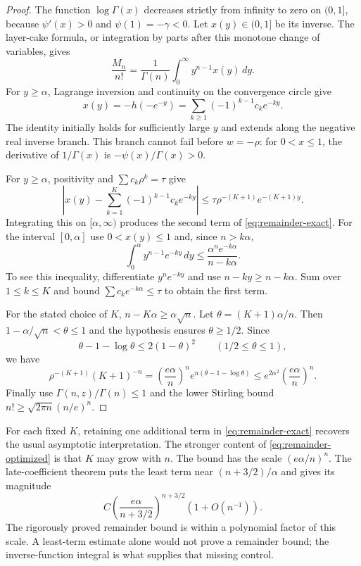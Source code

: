\begin{proof}
The function $\log\Gamma(x)$ decreases strictly from infinity to zero on
$(0,1]$, because $\psi'(x)>0$ and $\psi(1)=-\gamma<0$.
Let $x(y)\in(0,1]$ be its inverse.  The layer-cake formula, or integration
by parts after this monotone change of variables, gives
\begin{equation}
 \frac{M_n}{n!}=\frac1{\Gamma(n)}\int_0^\infty y^{n-1}x(y)\,dy.
 \label{eq:moment-inverse}
\end{equation}
For $y\ge\alpha$, Lagrange inversion and continuity on the convergence
circle give
\[
 x(y)=-h(-e^{-y})=\sum_{k\ge1}(-1)^{k-1}c_ke^{-ky}.
\]
The identity initially holds for sufficiently large $y$ and extends along
the negative real inverse branch.  This branch cannot fail before
$w=-\rho$: for $0<x\le1$, the derivative of $1/\Gamma(x)$ is
$-\psi(x)/\Gamma(x)>0$.

For $y\ge\alpha$, positivity and $\sum c_k\rho^k=\tau$ give
\[
 \left|x(y)-\sum_{k=1}^{K}(-1)^{k-1}c_ke^{-ky}\right|
 \le\tau\rho^{-(K+1)}e^{-(K+1)y}.
\]
Integrating this on $[\alpha,\infty)$ produces the second term of
\eqref{eq:remainder-exact}.
For the interval $[0,\alpha]$ use $0<x(y)\le1$ and, since $n>k\alpha$,
\[
 \int_0^\alpha y^{n-1}e^{-ky}\,dy
 \le\frac{\alpha^n e^{-k\alpha}}{n-k\alpha}.
\]
To see this inequality, differentiate $y^ne^{-ky}$ and use
$n-ky\ge n-k\alpha$.  Sum over $1\le k\le K$ and bound
$\sum c_ke^{-k\alpha}\le\tau$ to obtain the first term.

For the stated choice of $K$, $n-K\alpha\ge\alpha\sqrt n$.
Let $\theta=(K+1)\alpha/n$.  Then
$1-\alpha/\sqrt n<\theta\le1$ and the hypothesis ensures $\theta\ge1/2$.
Since
\[
 \theta-1-\log\theta\le2(1-\theta)^2\qquad(1/2\le\theta\le1),
\]
we have
\[
 \rho^{-(K+1)}(K+1)^{-n}
 =\left(\frac{e\alpha}{n}\right)^n
   e^{n(\theta-1-\log\theta)}
 \le e^{2\alpha^2}\left(\frac{e\alpha}{n}\right)^n.
\]
Finally use $\Gamma(n,z)/\Gamma(n)\le1$ and the lower Stirling bound
$n!\ge\sqrt{2\pi n}(n/e)^n$.
\end{proof}

For each fixed $K$, retaining one additional term in
\eqref{eq:remainder-exact} recovers the usual asymptotic interpretation.
The stronger content of \eqref{eq:remainder-optimized} is that $K$ may grow
with $n$.  The bound has the scale $(e\alpha/n)^n$.
The late-coefficient theorem puts the least term near
$(n+3/2)/\alpha$ and gives its magnitude
\[
 C\left(\frac{e\alpha}{n+3/2}\right)^{n+3/2}(1+O(n^{-1})).
\]
The rigorously proved remainder bound is within a polynomial factor of
this scale.  A least-term estimate alone would not prove a remainder bound;
the inverse-function integral is what supplies that missing control.

